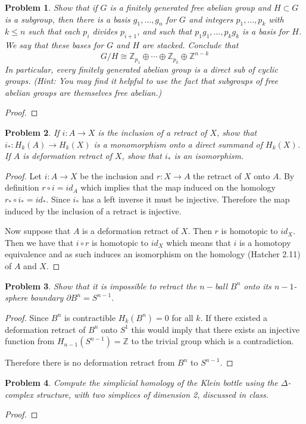 \documentclass[10pt]{article}
\newcommand{\sk}{\vskip 10mm}
\newcommand{\bb}[1]{\mathbb{#1}}
\theoremstyle{plain}
\newtheorem{problem}{Problem}
\theoremstyle{remark}
\begin{document}
\sk

\begin{problem}
  Show that if $G$ is a finitely generated free abelian group
  and $H\subset G$ is a subgroup, then there is a basis $g_1,\ldots,g_n$
  for $G$ and integers $p_1,\ldots,p_k$ with $k\leq n$ such that
  each $p_i$ divides $p_{i+1}$, and such that $p_1g_1,\ldots,p_kg_k$ is
  a basis for $H$. We say that these bases for $G$ and $H$ are
  stacked. Conclude that
  \[ G/H\cong \bb{Z}_{p_1}\oplus\cdots\oplus\bb{Z}_{p_k}\oplus\bb{Z}^{n-k} \]
  In particular, every finitely generated abelian group is a
  direct sub of cyclic groups. (Hint: You may find it helpful to
  use the fact that subgroups of free abelian groups are themselves
  free abelian.)
\end{problem}

\begin{proof}
  
\end{proof}

\sk

\begin{problem}
  If $i:A\rightarrow X$ is the inclusion of a retract of $X$, show that
  $i_*:H_k(A)\rightarrow H_k(X)$ is a monomorphism onto a direct summand of
  $H_k(X)$. If $A$ is deformation retract of $X$, show that
  $i_*$ is an isomorphism.
\end{problem}

\begin{proof}
  Let $i:A\rightarrow X$ be the inclusion and $r:X\rightarrow A$ the retract of $X$ onto $A$.
  By definition $r\circ i =id_A$ which implies that the map induced on the
  homology $r_*\circ i_* = id_*$. Since $i_*$ has a left inverse it must be
  injective. Therefore the map induced by the inclusion of a retract is
  injective.

  Now suppose that $A$ is a deformation retract of $X$. Then $r$ is
  homotopic to $id_X$. Then we have that $i\circ r$ is homotopic to $id_X$
  which means that $i$ is a homotopy equivalence and as such induces
  an isomorphism on the homology (Hatcher 2.11) of $A$ and $X$.
\end{proof}

\sk

\begin{problem}
  Show that it is impossible to retract the $n-$ball $B^n$ onto its
  $n-1$-sphere boundary $\partial B^n=S^{n-1}$.
\end{problem}

\begin{proof}
  Since $B^n$ is contractible $H_k(B^n)=0$ for all $k$. If there existed
  a deformation retract of $B^n$ onto $S^1$ this would imply that
  there exists an injective function from $H_{n-1}(S^{n-1})=\bb{Z}$
  to the trivial group which is a contradiction.

  Therefore there is no deformation retract from $B^n$ to $S^{n-1}$.
\end{proof}

\sk

\begin{problem}
  Compute the simplicial homology of the Klein bottle using the
  $\Delta$-complex structure, with two simplices of dimension 2, discussed in
  class.
\end{problem}

\begin{proof}
  
\end{proof}

\end{document}
